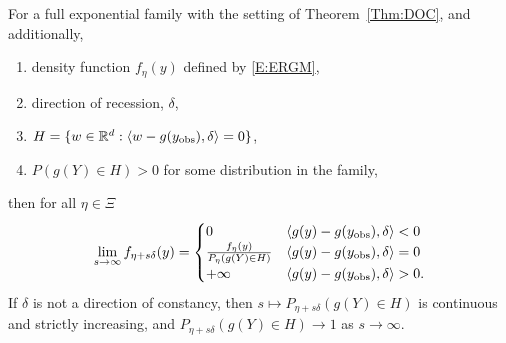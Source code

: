 \begin{theorem} \label{Thm:LCM}
For a full exponential family with the setting of Theorem~\ref{Thm:DOC}, and 
additionally,
\begin{enumerate}
\item density function $f_{\eta}(y)$ defined by \eqref{E:ERGM},
\item direction of recession, $\delta$,
\item $H = \{ w \in {\mathbb R}^d: \langle  w-g(y_{\textrm{obs}}), \delta  \rangle = 0 \}$,
\item $P( g(Y) \in H) > 0$ for some distribution in the family,
\end{enumerate}
then for all $\eta \in \Xi$
\begin{align} \label{E:LCM}
\lim_{s \to \infty} f_{\eta+s\delta}(y) = 
			\begin{cases} 
			0 								& \langle g(y) - g(y_{\textrm{obs}}), \delta \rangle < 0 \\
			\frac{f_\eta(y)}{P_\eta(g(Y) \in H)} 	& \langle g(y) - g(y_{\textrm{obs}}),
\delta \rangle = 0 \\
			+\infty							& \langle g(y) - g(y_{\textrm{obs}}), \delta \rangle > 0.
		\end{cases}
\end{align}
If $\delta$ is not a direction of constancy, 
then $s \mapsto P_{\eta+s\delta}( g(Y) \in H)$ is continuous and 
strictly increasing, and $P_{\eta+s\delta}( g(Y) \in H) \to 1$ as $s \to \infty$.
\end{theorem}


